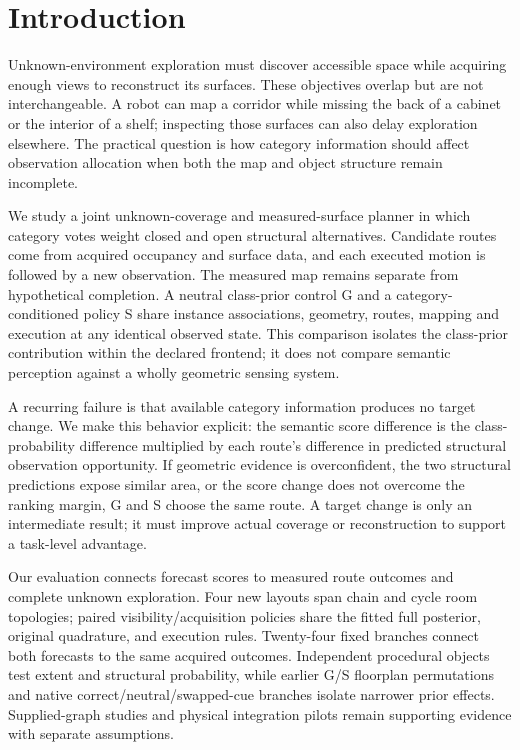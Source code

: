 \section{Introduction}\label{introduction}
Unknown-environment exploration must discover accessible space while acquiring enough views to reconstruct its surfaces. These objectives overlap but are not interchangeable. A robot can map a corridor while missing the back of a cabinet or the interior of a shelf; inspecting those surfaces can also delay exploration elsewhere. The practical question is how category information should affect observation allocation when both the map and object structure remain incomplete.

We study a joint unknown-coverage and measured-surface planner in which category votes weight closed and open structural alternatives. Candidate routes come from acquired occupancy and surface data, and each executed motion is followed by a new observation. The measured map remains separate from hypothetical completion. A neutral class-prior control G and a category-conditioned policy S share instance associations, geometry, routes, mapping and execution at any identical observed state. This comparison isolates the class-prior contribution within the declared frontend; it does not compare semantic perception against a wholly geometric sensing system.

A recurring failure is that available category information produces no target change. We make this behavior explicit: the semantic score difference is the class-probability difference multiplied by each route's difference in predicted structural observation opportunity. If geometric evidence is overconfident, the two structural predictions expose similar area, or the score change does not overcome the ranking margin, G and S choose the same route. A target change is only an intermediate result; it must improve actual coverage or reconstruction to support a task-level advantage.

Our evaluation connects forecast scores to measured route outcomes and complete unknown exploration. Four new layouts span chain and cycle room topologies; paired visibility/acquisition policies share the fitted full posterior, original quadrature, and execution rules. Twenty-four fixed branches connect both forecasts to the same acquired outcomes. Independent procedural objects test extent and structural probability, while earlier G/S floorplan permutations and native correct/neutral/swapped-cue branches isolate narrower prior effects. Supplied-graph studies and physical integration pilots remain supporting evidence with separate assumptions.


